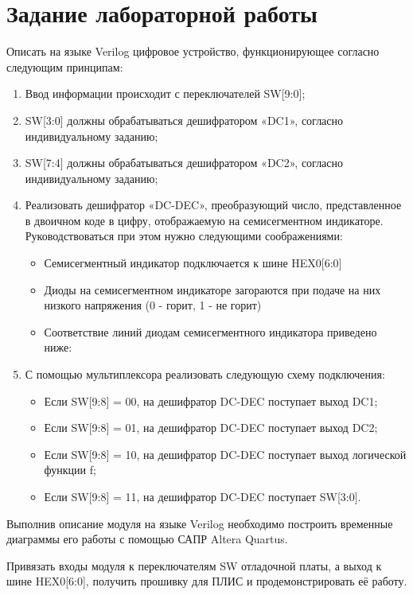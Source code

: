 \section{Задание лабораторной работы}
\par{Описать на языке Verilog цифровое устройство, функционирующее согласно следующим принципам:}
\begin{enumerate}
  \item Ввод информации происходит с переключателей SW[9:0];
  \item SW[3:0] должны обрабатываться дешифратором «DC1», согласно индивидуальному заданию;
  \item SW[7:4] должны обрабатываться дешифратором «DC2», согласно индивидуальному заданию;
  \item Реализовать дешифратор «DC-DEC», преобразующий число, представленное в двоичном коде в цифру, отображаемую на семисегментном индикаторе. Руководствоваться при этом нужно следующими соображениями:
    \begin{itemize}
      \item Семисегментный индикатор подключается к шине HEX0[6:0]
      \item Диоды на семисегментном индикаторе загораются при подаче на них низкого напряжения (0 - горит, 1 - не горит)
      \item Соответствие линий диодам семисегментного индикатора приведено ниже:
        \begin{figure}[H]
          \centering
          \def\svgwidth{\columnwidth}
          
          \label{fig:decoder}
        \end{figure}
    \end{itemize}
    \item С помощью мультиплексора реализовать следующую схему подключения:
      \begin{itemize}
        \item Если SW[9:8] = 00, на дешифратор DC-DEC поступает выход DC1;
        \item Если SW[9:8] = 01, на дешифратор DC-DEC поступает выход DC2;
        \item Если SW[9:8] = 10, на дешифратор DC-DEC поступает выход логической функции f;
        \item Если SW[9:8] = 11, на дешифратор DC-DEC поступает SW[3:0].
      \end{itemize}
\end{enumerate}

\par{Выполнив описание модуля на языке Verilog необходимо построить временные диаграммы его работы с помощью САПР Altera Quartus.}
\par{Привязать входы модуля к переключателям SW отладочной платы, а выход к шине HEX0[6:0], получить прошивку для ПЛИС и продемонстрировать её работу.}


